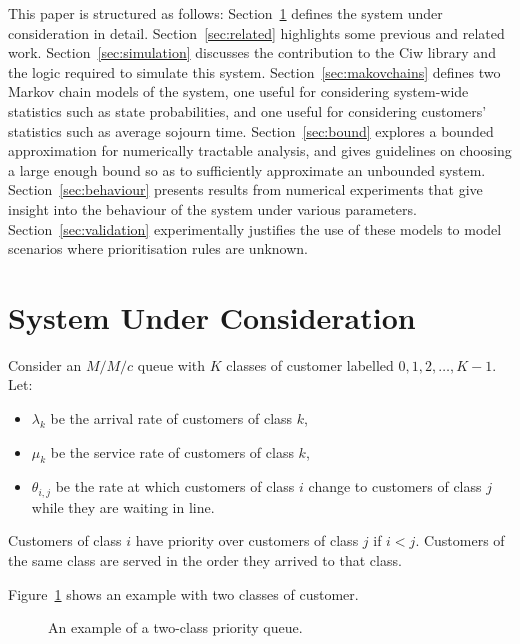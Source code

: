 \documentclass{article}
\begin{document}
This paper is structured as follows:
Section~\ref{sec:system} defines the system under consideration in detail.
Section~\ref{sec:related} highlights some previous and related work.
Section~\ref{sec:simulation} discusses the contribution to the Ciw library and
the logic required to simulate this system.
Section~\ref{sec:makovchains} defines two Markov chain models of the system, one
useful for considering system-wide statistics such as state probabilities, and
one useful for considering customers' statistics such as average sojourn time.
Section~\ref{sec:bound} explores a bounded approximation for numerically
tractable analysis, and gives guidelines on choosing a large enough bound so as
to sufficiently approximate an unbounded system.
Section~\ref{sec:behaviour} presents results from numerical experiments that
give insight into the behaviour of the system under various parameters.
Section~\ref{sec:validation} experimentally justifies the use of these models
to model scenarios where prioritisation rules are unknown.





\section{System Under Consideration}\label{sec:system}
Consider an $M/M/c$ queue with $K$ classes of customer labelled
$0, 1, 2, \dots, K-1$.
Let:

\begin{itemize}
  \item $\lambda_k$ be the arrival rate of customers of class $k$,
  \item $\mu_k$ be the service rate of customers of class $k$,
  \item $\theta_{i,j}$ be the rate at which customers of class $i$ change
  to customers of class $j$ while they are waiting in line.
\end{itemize}

Customers of class $i$ have priority over customers of class $j$ if $i < j$.
Customers of the same class are served in the order they arrived to that class.

Figure~\ref{fig:twoclass_example} shows an example with two classes of customer.

\begin{figure}
\begin{center}

\end{center}
\caption{An example of a two-class priority queue.}
\label{fig:twoclass_example}
\end{figure}
\end{document}
